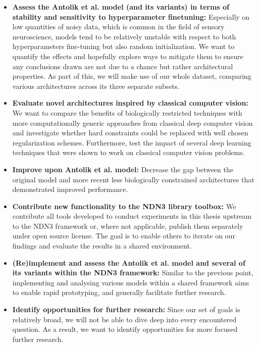 \begin{itemize}
    \item \textbf{Assess the Antolik et al. model (and its variants) in terms of stability and sensitivity to hyperparameter finetuning:} Especially on low quantities of noisy data, which is common in the field of sensory neuroscience, models tend to be relatively unstable with respect to both hyperparameters fine-tuning but also random initialization. We want to quantify the effects and hopefully explore ways to mitigate them to ensure any conclusions drawn are not due to a chance but rather architectural properties. As part of this, we will make use of our whole dataset, comparing various architectures across its three separate subsets.
    \item \textbf{Evaluate novel architectures inspired by classical computer vision:} We want to compare the benefits of biologically restricted techniques with more computationally generic approaches from classical deep computer vision and investigate whether hard constraints could be replaced with well chosen regularization schemes. Furthermore, test the impact of several deep learning techniques that were shown to work on classical computer vision problems.
    \item \textbf{Improve upon Antolik et al. model:} Decrease the gap between the original model and more recent less biologically constrained architectures that demonstrated improved performance. 
    \item \textbf{Contribute new functionality to the NDN3 library toolbox:} We contribute all tools developed to conduct experiments in this thesis upstream to the NDN3 framework or, where not applicable, publish them separately under open source license. The goal is to enable others to iterate on our findings and evaluate the results in a shared environment.
    \item \textbf{(Re)implement and assess the Antolik et al. model and several of its variants within the NDN3 framework:} Similar to the previous point, implementing and analysing various models within a shared framework aims to enable rapid prototyping, and generally facilitate further research.
    \item \textbf{Identify opportunities for further research:} Since our set of goals is relatively broad, we will not be able to dive deep into every encountered question. As a result, we want to identify opportunities for more focused further research.
\end{itemize}

